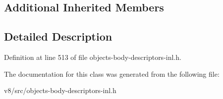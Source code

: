 \subsection*{Additional Inherited Members}


\subsection{Detailed Description}


Definition at line 513 of file objects-\/body-\/descriptors-\/inl.\+h.



The documentation for this class was generated from the following file\+:\begin{DoxyCompactItemize}
\item 
v8/src/objects-\/body-\/descriptors-\/inl.\+h\end{DoxyCompactItemize}
